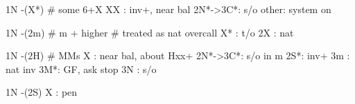 1N -(X*) # some 6+X
XX : inv+, near bal
2N*->3C*: s/o
other: system on

1N -(2m) # m + higher
# treated as nat overcall
X* : t/o
2X : nat

1N -(2H) # MMs
X  : near bal, about Hxx+
2N*->3C*: s/o in m
2S*: inv+
3m : nat inv
3M*: GF, ask stop
3N : s/o

1N -(2S)
X  : pen
